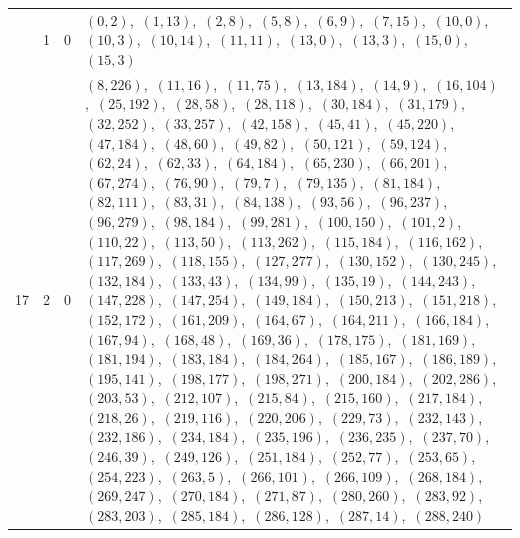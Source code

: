 \documentclass[11pt]{article}
\begin{document}
\begin{longtable}{@{}rrl>{\raggedright\arraybackslash}p{}@{}}
\addlinespace[3pt]
17 & 1 & $0$ & $(0,2)$,\allowbreak\ $(1,13)$,\allowbreak\ $(2,8)$,\allowbreak\ $(5,8)$,\allowbreak\ $(6,9)$,\allowbreak\ $(7,15)$,\allowbreak\ $(10,0)$,\allowbreak\ $(10,3)$,\allowbreak\ $(10,14)$,\allowbreak\ $(11,11)$,\allowbreak\ $(13,0)$,\allowbreak\ $(13,3)$,\allowbreak\ $(15,0)$,\allowbreak\ $(15,3)$\\
17 & 2 & $0$ & $(8,226)$,\allowbreak\ $(11,16)$,\allowbreak\ $(11,75)$,\allowbreak\ $(13,184)$,\allowbreak\ $(14,9)$,\allowbreak\ $(16,104)$,\allowbreak\ $(25,192)$,\allowbreak\ $(28,58)$,\allowbreak\ $(28,118)$,\allowbreak\ $(30,184)$,\allowbreak\ $(31,179)$,\allowbreak\ $(32,252)$,\allowbreak\ $(33,257)$,\allowbreak\ $(42,158)$,\allowbreak\ $(45,41)$,\allowbreak\ $(45,220)$,\allowbreak\ $(47,184)$,\allowbreak\ $(48,60)$,\allowbreak\ $(49,82)$,\allowbreak\ $(50,121)$,\allowbreak\ $(59,124)$,\allowbreak\ $(62,24)$,\allowbreak\ $(62,33)$,\allowbreak\ $(64,184)$,\allowbreak\ $(65,230)$,\allowbreak\ $(66,201)$,\allowbreak\ $(67,274)$,\allowbreak\ $(76,90)$,\allowbreak\ $(79,7)$,\allowbreak\ $(79,135)$,\allowbreak\ $(81,184)$,\allowbreak\ $(82,111)$,\allowbreak\ $(83,31)$,\allowbreak\ $(84,138)$,\allowbreak\ $(93,56)$,\allowbreak\ $(96,237)$,\allowbreak\ $(96,279)$,\allowbreak\ $(98,184)$,\allowbreak\ $(99,281)$,\allowbreak\ $(100,150)$,\allowbreak\ $(101,2)$,\allowbreak\ $(110,22)$,\allowbreak\ $(113,50)$,\allowbreak\ $(113,262)$,\allowbreak\ $(115,184)$,\allowbreak\ $(116,162)$,\allowbreak\ $(117,269)$,\allowbreak\ $(118,155)$,\allowbreak\ $(127,277)$,\allowbreak\ $(130,152)$,\allowbreak\ $(130,245)$,\allowbreak\ $(132,184)$,\allowbreak\ $(133,43)$,\allowbreak\ $(134,99)$,\allowbreak\ $(135,19)$,\allowbreak\ $(144,243)$,\allowbreak\ $(147,228)$,\allowbreak\ $(147,254)$,\allowbreak\ $(149,184)$,\allowbreak\ $(150,213)$,\allowbreak\ $(151,218)$,\allowbreak\ $(152,172)$,\allowbreak\ $(161,209)$,\allowbreak\ $(164,67)$,\allowbreak\ $(164,211)$,\allowbreak\ $(166,184)$,\allowbreak\ $(167,94)$,\allowbreak\ $(168,48)$,\allowbreak\ $(169,36)$,\allowbreak\ $(178,175)$,\allowbreak\ $(181,169)$,\allowbreak\ $(181,194)$,\allowbreak\ $(183,184)$,\allowbreak\ $(184,264)$,\allowbreak\ $(185,167)$,\allowbreak\ $(186,189)$,\allowbreak\ $(195,141)$,\allowbreak\ $(198,177)$,\allowbreak\ $(198,271)$,\allowbreak\ $(200,184)$,\allowbreak\ $(202,286)$,\allowbreak\ $(203,53)$,\allowbreak\ $(212,107)$,\allowbreak\ $(215,84)$,\allowbreak\ $(215,160)$,\allowbreak\ $(217,184)$,\allowbreak\ $(218,26)$,\allowbreak\ $(219,116)$,\allowbreak\ $(220,206)$,\allowbreak\ $(229,73)$,\allowbreak\ $(232,143)$,\allowbreak\ $(232,186)$,\allowbreak\ $(234,184)$,\allowbreak\ $(235,196)$,\allowbreak\ $(236,235)$,\allowbreak\ $(237,70)$,\allowbreak\ $(246,39)$,\allowbreak\ $(249,126)$,\allowbreak\ $(251,184)$,\allowbreak\ $(252,77)$,\allowbreak\ $(253,65)$,\allowbreak\ $(254,223)$,\allowbreak\ $(263,5)$,\allowbreak\ $(266,101)$,\allowbreak\ $(266,109)$,\allowbreak\ $(268,184)$,\allowbreak\ $(269,247)$,\allowbreak\ $(270,184)$,\allowbreak\ $(271,87)$,\allowbreak\ $(280,260)$,\allowbreak\ $(283,92)$,\allowbreak\ $(283,203)$,\allowbreak\ $(285,184)$,\allowbreak\ $(286,128)$,\allowbreak\ $(287,14)$,\allowbreak\ $(288,240)$\\

\end{longtable}
\end{document}
